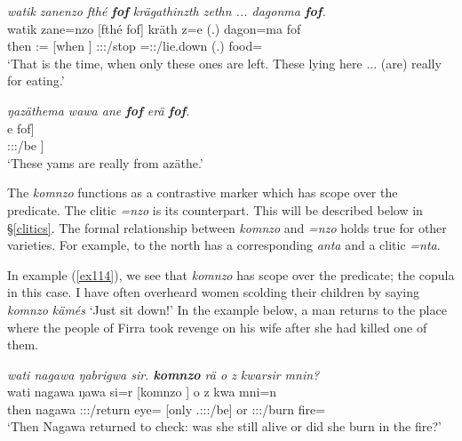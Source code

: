 \begin{exe}
	\ex \emph{watik zanenzo fthé \textbf{fof} krägathinzth zethn ... dagonma \textbf{fof}.}\\
	\gll watik zane=nzo [fthé fof] kräth z=e (.) dagon=ma fof\\
	then \Dem{}:\Prox{}=\Only{} [when \Emph{}] \Stpl:\Sbj:\Irr:\Pfv/stop \Prox=\Stpl\Sbj:\Nonpast:\Stat/lie.down (.) food=\Char{} \Emph{}\\
	\trans `That is the time, when only these ones are left. These lying here ... (are) really for eating.'
	\label{ex112}
\end{exe}
\begin{exe}
	\ex \emph{ŋazäthema wawa ane \textbf{fof} erä \textbf{fof}.}\\
	\gll [ŋazäthe=ma [wawa ane fof] e fof]\\
	[ŋazäthe=\Char{} [yam \Dem{} \Emph{}] \Stpl:\Sbj:\Nonpast:\Ipfv/be \Emph{}]\\
	\trans `These yams are really from \NG{}azäthe.'
	\label{ex113}
\end{exe}

The  \emph{komnzo} functions as a contrastive  marker which has scope over the predicate. The clitic \emph{=nzo} is its  counterpart. This will be described below in \S{}\ref{clitics}. The formal relationship between \emph{komnzo} and \emph{=nzo} holds true for other  varieties. For example,  to the north has a corresponding  \emph{anta} and a clitic \emph{=nta}.%

In example (\ref{ex114}), we see that \emph{komnzo} has scope over the predicate; the copula in this case. I have often overheard women scolding their children by saying \emph{komnzo kämés} `Just sit down!' In the example below, a man returns to the place where the people of Firra took revenge on his wife after she had killed one of them.

\begin{exe}
	\ex	\emph{wati nagawa ŋabrigwa sir. \textbf{komnzo} rä o z kwarsir mnin?}\\
	\gll wati nagawa ŋawa si=r [komnzo ] o z kwa mni=n\\
	then nagawa \Stsg:\Sbj:\Pst:\Ipfv/return eye=\Purp{} [only \Tsg.\F:\Sbj:\Nonpast:\Ipfv/be] or \Iam{} \Stsg:\Sbj:\Rpst:\Ipfv/burn fire=\Loc{}\\
	\trans `Then Nagawa returned to check: was she still alive or did she burn in the fire?'
	\label{ex114}
\end{exe}

